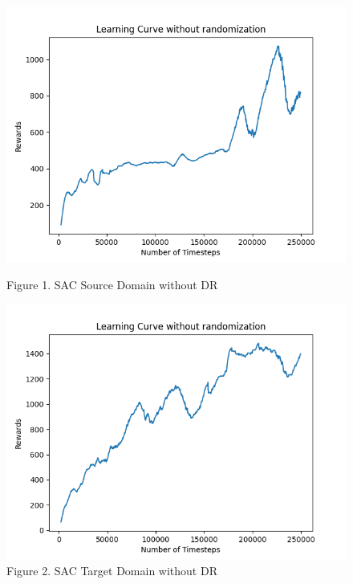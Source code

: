 \documentclass[12pt]{article}
\begin{document}
\begin{figure}[H]
    \centering
    \begin{minipage}{0.45\textwidth}
        \centering
        \includegraphics[width=\textwidth]{../images/Learning_Curve_SAC_no_rand_Source.png}
        \caption{Figure 1. SAC Source Domain without DR}
        \label{fig:sac_source_no_dr}
    \end{minipage}
    \hfill
    \begin{minipage}{0.45\textwidth}
        \centering
        \includegraphics[width=\textwidth]{../images/Learning_Curve_SAC_no_rand_Target.png}
        \caption{Figure 2. SAC Target Domain without DR}
        \label{fig:sac_target_no_dr}
    \end{minipage}

\end{figure}
\end{document}
